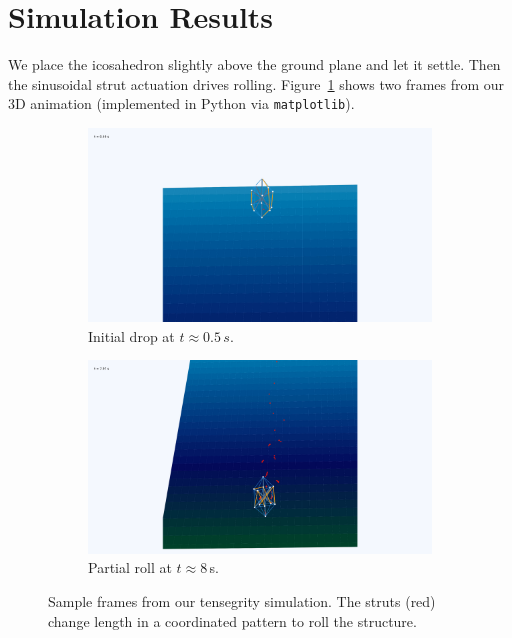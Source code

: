 \documentclass[12pt,letterpaper]{article}
\begin{document}
\section{Simulation Results}
We place the icosahedron slightly above the ground plane and let it settle.  Then the sinusoidal strut actuation drives rolling.  Figure~\ref{fig:simulation} shows two frames from our 3D animation (implemented in Python via \texttt{matplotlib}).

\begin{figure}[H]
\centering
    \begin{subfigure}[b]{0.78\linewidth}
        \includegraphics[width=\linewidth]{default-0.5s.png}
        \caption{Initial drop at $t\approx 0.5\,s$.}
    \end{subfigure}
    \vspace{0.8em}
    \begin{subfigure}[b]{0.78\linewidth}
        \includegraphics[width=\linewidth]{default-8.0s.png}
        \caption{Partial roll at $t\approx 8$\,s.}
    \end{subfigure}
    \caption{Sample frames from our tensegrity simulation. The struts (red) change length in a coordinated pattern to roll the structure.}
    \label{fig:simulation}
\end{figure}
\end{document}
